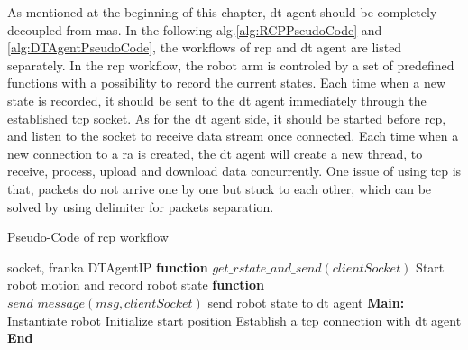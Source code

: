 As mentioned at the beginning of this chapter, \gls{dt} agent should be completely decoupled from \gls{mas}. 
In the following alg.\ref{alg:RCPPseudoCode} and \ref{alg:DTAgentPseudoCode}, the workflows of \gls{rcp} and \gls{dt} agent are listed separately.
In the \gls{rcp} workflow, the robot arm is controled by a set of predefined functions with a possibility to record the current states. 
Each time when a new state is recorded, it should be sent to the \gls{dt} agent immediately through the established \gls{tcp} socket.
As for the \gls{dt} agent side, it should be started before \gls{rcp}, and listen to the socket to receive data stream once connected.
Each time when a new connection to a \gls{ra} is created, the \gls{dt} agent will create a new thread, to receive, process, upload and download data concurrently.
One issue of using \gls{tcp} is that, packets do not arrive one by one but stuck to each other, which can be solved by using delimiter for packets separation.  



\begin{breakablealgorithm}
    \caption{Pseudo-Code of \gls{rcp} workflow}
    \label{alg:RCPPseudoCode}
    \begin{algorithmic}
     socket, franka
     DTAgentIP
    \State \textbf{function} {$get\_rstate\_and\_send(clientSocket)$}
        \State \qquad Start robot motion and record robot state
        \State {}
    \State \textbf{function} {$send\_message(msg, clientSocket)$}
        \State \qquad send robot state to \gls{dt} agent
    \State \textbf{Main:}
    \State \qquad Instantiate robot
    \State \qquad Initialize start position
    \State \qquad Establish a \gls{tcp} connection with \gls{dt} agent  
    \State {}
    \State \textbf{End}
    \end{algorithmic}
\end{breakablealgorithm}


